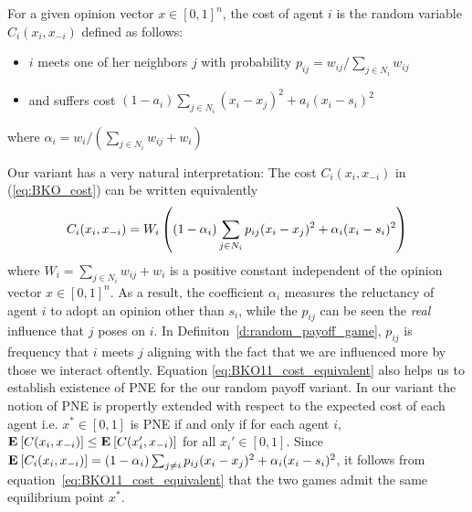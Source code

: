 \begin{definition}\label{d:random_payoff_game}
  For a given opinion vector $x \in [0,1]^n$, the cost of agent $i$
  is the random variable $C_i(x_i,x_{-i})$ defined as follows:
  \begin{itemize}
    \item $i$ meets one of her neighbors $j$ with probability $p_{ij}= w_{ij}/\sum_{j\in N_i}w_{ij}$
    \item and suffers cost $(1-a_i)\sum_{j \in N_i}(x_i-x_j)^2 + a_i(x_i-s_i)^2$
  \end{itemize}
  where $\alpha_i = w_i/(\sum_{j\in N_i}w_{ij}+w_i)$
\end{definition}
\noindent Our variant has a very natural interpretation: The cost $C_i(x_i,x_{-i})$ in (\ref{eq:BKO_cost})
can be written equivalently 
\begin{equation}\label{eq:BKO11_cost_equivalent}
C_i(x_i,x_{-i}) = W_i\left( (1-\alpha_i)\sum_{j \in N_i} p_{ij}(x_i-x_j)^2  + \alpha_i(x_i-s_i)^2\right)
\end{equation}
where $W_i=\sum_{j\in N_i}w_{ij} + w_i$ is a positive constant independent of the opinion vector $x\in [0,1]^n$. As a result, the coefficient $\alpha_i$
measures the reluctancy of agent $i$ to adopt an opinion other than $s_i$, while the $p_{ij}$ can be seen the \emph{real} influence that $j$ poses on $i$.
In Definiton~\ref{d:random_payoff_game}, $p_{ij}$ is frequency that $i$ meets $j$ aligning with the fact that we are influenced more by those we interact
oftently. Equation \ref{eq:BKO11_cost_equivalent} also helps us to establish existence of PNE for the our random payoff variant. 
In our variant the notion of PNE is propertly extended with respect to the expected cost of each agent i.e. $x^* \in [0,1]$ is PNE if and only if
for each agent $i$, $\Exp{C(x_i, x_{-i})} \leq \Exp{C(x_i', x_{-i})}$ for all $x_i' \in [0,1]$. Since 
$\bm{\mathrm{E}}_{} \left[ C_i(x_i,x_{-i}) \right]=(1-\alpha_i)\sum_{j \neq i}p_{ij}(x_i-x_j)^2 + \alpha_i(x_i-s_i)^2$, it follows
from equation~\ref{eq:BKO11_cost_equivalent} that the two games admit the same equilibrium point $x^*$.


